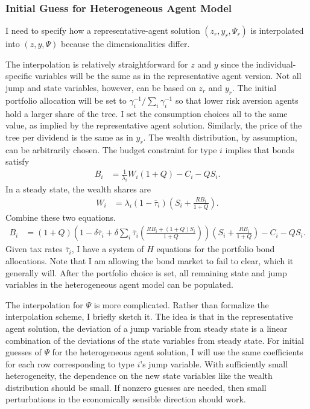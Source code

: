 \documentclass[12 pt, oneside]{article}
\theoremstyle{definition}
\theoremstyle{definition}
\theoremstyle{definition}
\begin{document}
\subsubsection{Initial Guess for Heterogeneous Agent Model}
I need to specify how a representative-agent solution $(z_r, y_r, \Psi_r)$ is interpolated into $(z, y, \Psi)$ because the dimensionalities differ.

The interpolation is relatively straightforward for $z$ and $y$ since
the individual-specific variables will be the same as in the representative agent version. Not all jump and state variables, however, can be
based on $z_r$ and $y_r$.
The initial portfolio allocation will be set to $\gamma_i^{-1} / \sum_i \gamma_i^{-1}$ so that lower risk aversion agents hold a larger share of the tree.
I set the consumption choices all to the same value, as implied by the representative agent solution. Similarly, the price of the tree per dividend is the same as in $y_r$. The wealth distribution, by assumption, can be arbitrarily chosen. The budget constraint for type $i$ implies that bonds satisfy
\begin{align*}
  B_i & = \frac{1}{\lambda_i}W_i(1 + Q) - C_i - Q S_i.
\end{align*}
In a steady state, the wealth shares are
\begin{align*}
  W_i & = \lambda_i(1 - \overline{\tau}_i)\left(S_i + \frac{R B_i}{1 + Q}\right).
\end{align*}
Combine these two equations.
\begin{align*}
  B_i & = (1 + Q)\left(1 - \delta \overline{\tau}_i + \delta \sum_i\overline{\tau}_i\left(\frac{R B_i + (1 + Q) S_i}{1 + Q}\right)\right)\left(S_i + \frac{R B_i}{1 + Q}\right) - C_i - Q S_i.
\end{align*}
Given tax rates $\overline{\tau}_i$, I have a system of $H$ equations for the portfolio bond allocations. Note that I am allowing the bond market to fail to clear, which it generally will. After the portfolio choice is set, all remaining state and jump variables in the heterogeneous agent model can be populated.

The interpolation for $\Psi$ is more complicated. Rather than formalize the interpolation scheme, I briefly sketch it. The idea is that in the representative agent solution, the deviation of a jump variable from steady state is a linear combination of the deviations of the state variables from steady state. For initial guesses of $\Psi$ for the heterogeneous agent solution, I will use the same coefficients for each row corresponding to type $i$'s jump variable. With sufficiently small heterogeneity, the dependence on the new state variables like the wealth distribution should be small. If nonzero guesses are needed, then small perturbations in the economically sensible direction should work.
\end{document}
